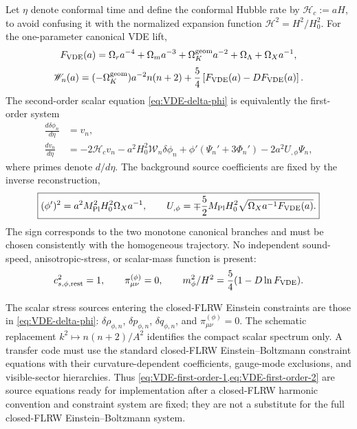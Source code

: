 \documentclass[11pt,a4paper]{article}
\def\dd{d}%
\def\Dil{D}%
\numberwithin{equation}{section}
\theoremstyle{definition}
\theoremstyle{plain}
\theoremstyle{remark}
\newcommand{\Dil}{\mathscr{D}}
\newcommand{\dd}{\mathrm{d}}
\begin{document}
Let \(\eta\) denote conformal time and define the conformal Hubble rate by \(\mathscr H_c:=aH\), to avoid confusing it with the normalized expansion function \(\mathcal H^2=H^2/H_0^2\).  For the one-parameter canonical VDE lift,
\begin{equation}
F_{\rm VDE}(a)=
\Omega_r a^{-4}+\Omega_m a^{-3}+\Omega_K^{\rm geom}a^{-2}
+\Omega_\Lambda+\Omega_Xa^{-1},
\end{equation}
\begin{equation}
\mathscr W_n(a)=
(-\Omega_K^{\rm geom})a^{-2}n(n+2)
+\frac54\left[F_{\rm VDE}(a)-\Dil F_{\rm VDE}(a)\right].
\end{equation}
The second-order scalar equation \cref{eq:VDE-delta-phi} is equivalently the first-order system
\begin{align}
\frac{\dd\delta\phi_n}{\dd\eta}&=v_n,\label{eq:VDE-first-order-1}\\
\frac{\dd v_n}{\dd\eta}
&=-2\mathscr H_c v_n
-a^2H_0^2\mathscr W_n\delta\phi_n
+\phi'\left(\Psi_n'+3\Phi_n'\right)
-2a^2U_{,\phi}\Psi_n,
\label{eq:VDE-first-order-2}
\end{align}
where primes denote \(\dd/\dd\eta\).  The background source coefficients are fixed by the inverse reconstruction,
\begin{equation}
\boxed{
(\phi')^2=a^2M_{\rm Pl}^2H_0^2\Omega_Xa^{-1},
\qquad
U_{,\phi}
=\mp\frac52M_{\rm Pl}H_0^2
\sqrt{\Omega_Xa^{-1}F_{\rm VDE}(a)}.}
\label{eq:VDE-conformal-source-coefficients}
\end{equation}
The sign corresponds to the two monotone canonical branches and must be chosen consistently with the homogeneous trajectory.  No independent sound-speed, anisotropic-stress, or scalar-mass function is present:
\begin{equation}
c_{s,\phi,{\rm rest}}^2=1,
\qquad
\pi^{(\phi)}_{\mu\nu}=0,
\qquad
m_\phi^2/H^2=\frac54(1-\Dil\ln F_{\rm VDE}).
\end{equation}

The scalar stress sources entering the closed-FLRW Einstein constraints are those in \cref{eq:VDE-delta-phi}: \(\delta\rho_{\phi,n}\), \(\delta p_{\phi,n}\), \(\delta q_{\phi,n}\), and \(\pi_{\mu\nu}^{(\phi)}=0\).  The schematic replacement \(k^2\mapsto n(n+2)/A^2\) identifies the compact scalar spectrum only.  A transfer code must use the standard closed-FLRW Einstein--Boltzmann constraint equations with their curvature-dependent coefficients, gauge-mode exclusions, and visible-sector hierarchies.  Thus \cref{eq:VDE-first-order-1,eq:VDE-first-order-2} are source equations ready for implementation after a closed-FLRW harmonic convention and constraint system are fixed; they are not a substitute for the full closed-FLRW Einstein--Boltzmann system.
\end{document}
